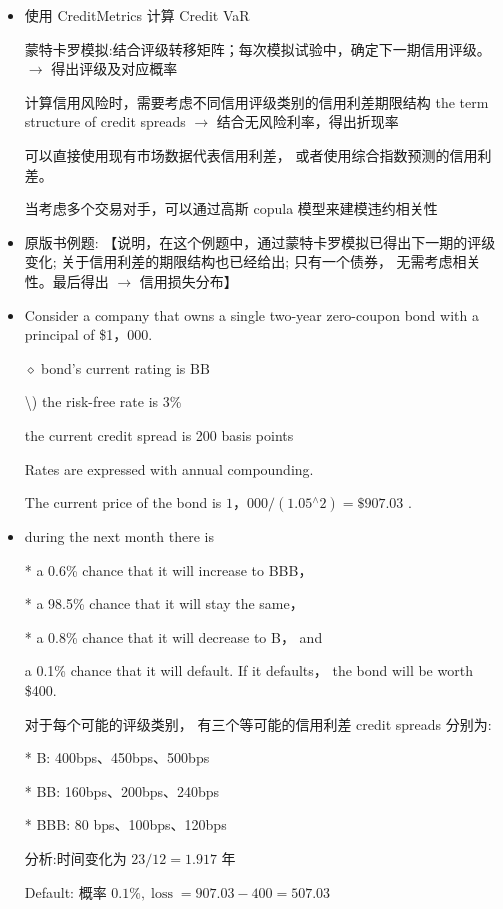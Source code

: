 \begin{itemize}
\item 使用 CreditMetrics 计算 Credit VaR

蒙特卡罗模拟:结合评级转移矩阵；每次模拟试验中，确定下一期信用评级。 \(\rightarrow\) 得出评级及对应概率

 计算信用风险时，需要考虑不同信用评级类别的信用利差期限结构 the term structure of credit spreads \(\rightarrow\) 结合无风险利率，得出折现率

可以直接使用现有市场数据代表信用利差， 或者使用综合指数预测的信用利差。

当考虑多个交易对手，可以通过高斯 copula 模型来建模违约相关性

\item 原版书例题: 【说明，在这个例题中，通过蒙特卡罗模拟已得出下一期的评级变化; 关于信用利差的期限结构也已经给出; 只有一个债券， 无需考虑相关性。最后得出 \(\rightarrow\) 信用损失分布】

\item Consider a company that owns a single two-year zero-coupon bond with a principal of \$1，000.

\(\diamond\) bond’s current rating is \(\mathrm{{BB}}\)

\textbackslash  ) the risk-free rate is 3\%

 the current credit spread is 200 basis points

 Rates are expressed with annual compounding.

The current price of the bond is \(1，{000}/\left( {{1.05}{}^{ \land  }2}\right)  = \$ {907.03}\) .

\item during the next month there is

* a 0.6\% chance that it will increase to BBB，

* a 98.5\% chance that it will stay the same，

* a 0.8\% chance that it will decrease to B， and

a 0.1\% chance that it will default. If it defaults， the bond will be worth \$400.

对于每个可能的评级类别， 有三个等可能的信用利差 credit spreads 分别为:

* B: 400bps、450bps、500bps

* BB: 160bps、200bps、240bps

* BBB: 80 bps、100bps、120bps

 分析:时间变化为 \({23}/{12} = {1.917}\) 年

 Default: 概率 \({0.1}\% ,\operatorname{loss} = {907.03} - {400} = {507.03}\)


\end{itemize}
